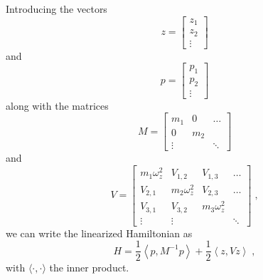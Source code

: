\documentclass[aps, pra, preprint]{revtex4-1}
\begin{document}
Introducing the vectors
\begin{equation}
  z=\left[
    \begin{array}{c}
      z_1\\
      z_2\\
      \vdots
    \end{array}
  \right]
\end{equation}
and
\begin{equation}
  p=\left[
    \begin{array}{c}
      p_1\\
      p_2\\
      \vdots
    \end{array}
  \right]
\end{equation}
along with the matrices
\begin{equation}
  M=\left[
    \begin{array}{ccc}
      m_1&0&\hdots\\
      0&m_2&\\
      \vdots&&\ddots
    \end{array}
  \right]
\end{equation}
and
\begin{equation}
  V=\left[
    \begin{array}{cccc}
      m_1\omega_z^2&V_{1,2}&V_{1,3}&\hdots\\
      V_{2,1}&m_2\omega_z^2&V_{2,3}&\hdots\\
      V_{3,1}&V_{3,2}&m_3\omega_z^2&\\
      \vdots&\vdots&&\ddots
    \end{array}
  \right]\;,
\end{equation}
we can write the linearized Hamiltonian as
\begin{equation}
  H =
  \frac{1}{2}\left\langle p, M^{-1}p \right\rangle +
  \frac{1}{2}\left\langle z, V z \right \rangle\;,
  \label{eqn:linearized_hamiltonian}
\end{equation}
with $\langle \cdot, \cdot\rangle$ the inner product.
\end{document}
